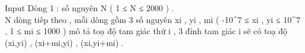 Input
Dòng 1 : số nguyên N ( 1 ≤ N ≤ 2000 ) .   
\\   N dòng tiếp theo , mỗi dòng gồm 3 số nguyên xi , yi , mi (  -10^7 ≤ xi , yi ≤ 10^7 , 1 ≤ mi  ≤ 1000 ) mô tả toạ độ tam giác thứ i , 3 đỉnh tam giác i sẽ có toạ độ (xi,yi) , (xi+mi,yi) , (xi,yi+mi) .